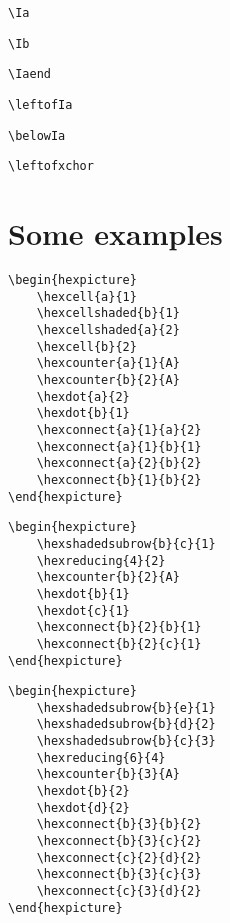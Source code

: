 \documentclass[a4paper,12pt]{article}
\begin{document}
	\verb|\Ia|
    
	\verb|\Ib|
    
	\verb|\Iaend|
    
	\verb|\leftofIa|
    
	\verb|\belowIa|
    
	\verb|\leftofxchor|
    
    \section{Some examples}
    
    \begin{verbatim}\begin{hexpicture}
    \hexcell{a}{1}
    \hexcellshaded{b}{1}
    \hexcellshaded{a}{2}
    \hexcell{b}{2}
    \hexcounter{a}{1}{A}
    \hexcounter{b}{2}{A}
    \hexdot{a}{2}
    \hexdot{b}{1}
    \hexconnect{a}{1}{a}{2}
    \hexconnect{a}{1}{b}{1}
    \hexconnect{a}{2}{b}{2}
    \hexconnect{b}{1}{b}{2}
\end{hexpicture}\end{verbatim}
    
    \begin{hexpicture}
    \end{hexpicture}
    
    \begin{verbatim}\begin{hexpicture}
    \hexshadedsubrow{b}{c}{1}
    \hexreducing{4}{2}
    \hexcounter{b}{2}{A}
    \hexdot{b}{1}
    \hexdot{c}{1}
    \hexconnect{b}{2}{b}{1}
    \hexconnect{b}{2}{c}{1}
\end{hexpicture}\end{verbatim}
    
    \begin{hexpicture}
    \end{hexpicture}
    
    \begin{verbatim}\begin{hexpicture}
    \hexshadedsubrow{b}{e}{1}
    \hexshadedsubrow{b}{d}{2}
    \hexshadedsubrow{b}{c}{3}
    \hexreducing{6}{4}
    \hexcounter{b}{3}{A}
    \hexdot{b}{2}
    \hexdot{d}{2}
    \hexconnect{b}{3}{b}{2}
    \hexconnect{b}{3}{c}{2}
    \hexconnect{c}{2}{d}{2}
    \hexconnect{b}{3}{c}{3}
    \hexconnect{c}{3}{d}{2}
\end{hexpicture}\end{verbatim}
    
\end{document}
